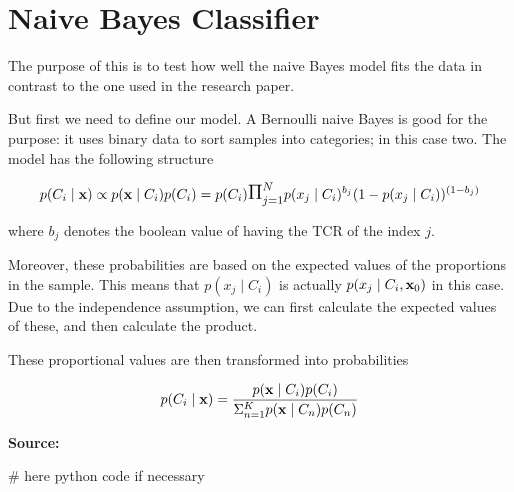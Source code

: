\documentclass[a4paper,11pt]{article}
\begin{document}
\thispagestyle{empty}

\section*{Naive Bayes Classifier}


The purpose of this is to test how well the naive Bayes model fits the data in contrast to the one used in the research paper.

But first we need to define our model. A Bernoulli naive Bayes is good for the purpose: it uses binary data to sort samples into categories; in this case two. The model has the following structure

\[ p(C_i \mid {\bf x} ) \propto p({\bf x} \mid C_i ) p(C_i) = p(C_i)\mathlarger{\mathlarger{ \Pi }}_{j=1}^{N} p(x_j \mid C_i)^{b_j}(1 - p(x_j \mid C_i))^{(1-b_j)} \]

where $b_j$ denotes the boolean value of having the TCR of the index $j$. 

Moreover, these probabilities are based on the expected values of the proportions in the sample. This means that $p(x_j \mid C_i)$ is actually $p(x_j \mid C_i, {\bf x}_0)$ in this case. Due to the independence assumption, we can first calculate the expected values of these, and then calculate the product.


These proportional values are then transformed into probabilities

\[ p(C_i \mid {\bf x} ) = \frac{p({\bf x} \mid C_i ) p(C_i) }{ \Sigma_{n=1}^K p({\bf x} \mid C_n ) p(C_n)} \]


{\bf Source:}

\begin{python}
# here python code if necessary
\end{python}
\end{document}
